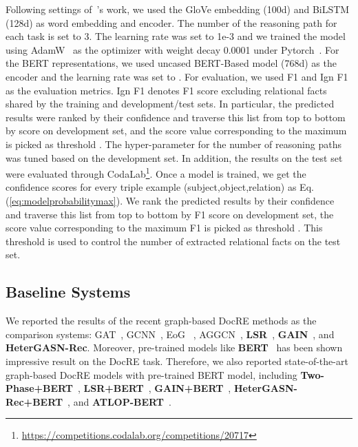 \documentclass[11pt,a4paper]{article}
\begin{document}
Following settings of~\citeauthor{yao-etal-2019-docred}'s work, we used the GloVe embedding (100d) and BiLSTM (128d) as word embedding and encoder.
The number of the reasoning path for each task is set to 3.
The learning rate was set to 1e-3 and we trained the model using AdamW~\cite{adamw2019} as the optimizer with weight decay 0.0001 under Pytorch~\cite{paszke2017pytorch}.
For the BERT representations, we used uncased BERT-Based model (768d) as the encoder and the learning rate was set to .
For evaluation, we used F1 and Ign F1 as the evaluation metrics. 
Ign F1 denotes F1 score excluding relational facts shared by the training and development/test sets.
In particular, the predicted results were ranked by their confidence and traverse this list from top to bottom by  score on development set, and the score value corresponding to the maximum  is picked as threshold .
The hyper-parameter for the number of reasoning paths was tuned based on the development set.
In addition, the results on the test set were evaluated through CodaLab\footnote{\url{https://competitions.codalab.org/competitions/20717}}.
Once a model is trained, we get the confidence scores for every triple example (subject,object,relation) as Eq.(\ref{eq:modelprobabilitymax}). 
We rank the predicted results by their confidence and traverse this list from top to bottom by F1 score on development set, the score value corresponding to the maximum F1 is picked as threshold . 
This threshold is used to control the number of extracted relational facts on the test set.

\subsection{Baseline Systems}
\label{sec4-2}
We reported the results of the recent graph-based DocRE methods as the comparison systems: GAT~\cite{Velickovic2018GraphAN}, GCNN~\cite{sahu-etal-2019-inter}, EoG ~\cite{Christopoulou2019ConnectingTD}, AGGCN~\cite{guo-etal-2019-attention}, \textbf{LSR}~\cite{Nan2020ReasoningWL}, \textbf{GAIN}~\cite{zeng-etal-2020-double}, and \textbf{HeterGASN-Rec}\cite{docred-rec}.
Moreover, pre-trained models like \textbf{BERT}~\cite{devlin-etal-2019-bert} has been shown impressive result on the DocRE task.
Therefore, we also reported state-of-the-art graph-based DocRE models with pre-trained BERT model, including 
\textbf{Two-Phase+BERT}~\cite{Wang2019FinetuneBF}, 
\textbf{LSR+BERT}~\cite{Nan2020ReasoningWL},
\textbf{GAIN+BERT}~\cite{zeng-etal-2020-double}, 
\textbf{HeterGASN-Rec+BERT}~\cite{docred-rec}, and \textbf{ATLOP-BERT}~\cite{zhou2021atlop}. 
\end{document}
